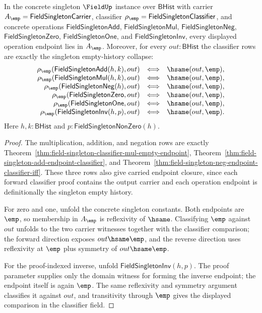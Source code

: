 \begin{theorem}
\label{thm:field-singleton-concrete-operation-table-collapse}
In the concrete singleton $\FieldUp$ instance over $\mathsf{BHist}$ with carrier
$A_{\emp}=\mathsf{FieldSingletonCarrier}$, classifier
$\rho_{\emp}=\mathsf{FieldSingletonClassifier}$, and concrete operations
$\mathsf{FieldSingletonAdd}$, $\mathsf{FieldSingletonMul}$,
$\mathsf{FieldSingletonNeg}$, $\mathsf{FieldSingletonZero}$,
$\mathsf{FieldSingletonOne}$, and $\mathsf{FieldSingletonInv}$, every displayed
operation endpoint lies in $A_{\emp}$. Moreover, for every
$out:\mathsf{BHist}$ the classifier rows are exactly the singleton empty-history
collapse:
$$
\begin{array}{rcl}
\rho_{\emp}(\mathsf{FieldSingletonAdd}(h,k),out)
&\Longleftrightarrow& \hsame(out,\emp),\\
\rho_{\emp}(\mathsf{FieldSingletonMul}(h,k),out)
&\Longleftrightarrow& \hsame(out,\emp),\\
\rho_{\emp}(\mathsf{FieldSingletonNeg}(h),out)
&\Longleftrightarrow& \hsame(out,\emp),\\
\rho_{\emp}(\mathsf{FieldSingletonZero},out)
&\Longleftrightarrow& \hsame(out,\emp),\\
\rho_{\emp}(\mathsf{FieldSingletonOne},out)
&\Longleftrightarrow& \hsame(out,\emp),\\
\rho_{\emp}(\mathsf{FieldSingletonInv}(h,p),out)
&\Longleftrightarrow& \hsame(out,\emp).
\end{array}
$$
Here $h,k:\mathsf{BHist}$ and
$p:\mathsf{FieldSingletonNonZero}(h)$.
\end{theorem}
\begin{proof}
The multiplication, addition, and negation rows are exactly
Theorem~\ref{thm:field-singleton-classifier-mul-empty-endpoint},
Theorem~\ref{thm:field-singleton-add-endpoint-classifier}, and
Theorem~\ref{thm:field-singleton-neg-endpoint-classifier-iff}. These three
rows also give carried endpoint closure, since each forward classifier proof
contains the output carrier and each operation endpoint is definitionally the
singleton empty history.

For zero and one, unfold the concrete singleton constants. Both endpoints are
$\emp$, so membership in $A_{\emp}$ is reflexivity of $\hsame$. Classifying
$\emp$ against $out$ unfolds to the two carrier witnesses together with the
classifier comparison; the forward direction exposes $out\hsame\emp$, and the
reverse direction uses reflexivity at $\emp$ plus symmetry of
$out\hsame\emp$.

For the proof-indexed inverse, unfold
$\mathsf{FieldSingletonInv}(h,p)$. The proof parameter supplies only the
domain witness for forming the inverse endpoint; the endpoint itself is again
$\emp$. The same reflexivity and symmetry argument classifies it against
$out$, and transitivity through $\emp$ gives the displayed comparison in the
classifier field.
\end{proof}

